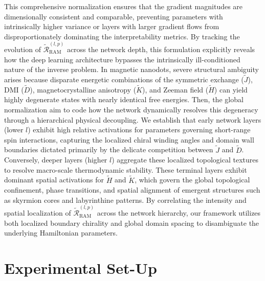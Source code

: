 \documentclass[final,5p,times,twocolumn]{elsarticle}
\begin{document}
This comprehensive normalization ensures that the gradient magnitudes are dimensionally consistent and comparable, preventing parameters with intrinsically higher variance or layers with larger gradient flows from disproportionately dominating the interpretability metrics. By tracking the evolution of $\tilde{\mathcal{R}}_{\text{RAM}}^{(l,p)}$ across the network depth, this formulation explicitly reveals how the deep learning architecture bypasses the intrinsically ill-conditioned nature of the inverse problem. In magnetic nanodots, severe structural ambiguity arises because disparate energetic combinations of the symmetric exchange ($\tilde{J}$), DMI ($\tilde{D}$), magnetocrystalline anisotropy ($\tilde{K}$), and Zeeman field ($\tilde{H}$) can yield highly degenerate states with nearly identical free energies. Then, the global normalization aim to code how the network dynamically resolves this degeneracy through a hierarchical physical decoupling. We establish that early network layers (lower $l$) exhibit high relative activations for parameters governing short-range spin interactions, capturing the localized chiral winding angles and domain wall boundaries dictated primarily by the delicate competition between $\tilde{J}$ and $\tilde{D}$. Conversely, deeper layers (higher $l$) aggregate these localized topological textures to resolve macro-scale thermodynamic stability. These terminal layers exhibit dominant spatial activations for $\tilde{H}$ and $\tilde{K}$, which govern the global topological confinement, phase transitions, and spatial alignment of emergent structures such as skyrmion cores and labyrinthine patterns. By correlating the intensity and spatial localization of $\tilde{\mathcal{R}}_{\text{RAM}}^{(l,p)}$ across the network hierarchy, our framework utilizes both localized boundary chirality and global domain spacing to disambiguate the underlying Hamiltonian parameters.


\section{Experimental Set-Up}\label{sec:experiments}
\end{document}
